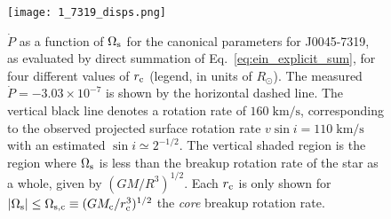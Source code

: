 \documentclass[
        fleqn,
        usenatbib,
    ]{mnras}
\newcommand*{\abs}[1]{\left|#1\right|}
\begin{document}
\begin{figure}
    \centering
    \texttt{[image: 1\_7319\_disps.png]}
    \caption{$\dot{P}$ as a function of $\Omega_{\rm s}$ for the canonical
    parameters for J0045-7319, as evaluated by direct summation of
    Eq.~\eqref{eq:ein_explicit_sum}, for four different values of $r_{\rm c}$
    (legend, in units of $R_{\odot}$). The measured $\dot{P} = -3.03\times
    10^{-7}$ is shown by the horizontal dashed line. The vertical black line
    denotes a rotation rate of $160\;\mathrm{km/s}$, corresponding to the
    observed projected surface rotation rate $v \sin i = 110\;\mathrm{km/s}$
    with an estimated $\sin i \simeq 2^{-1/2}$. The vertical shaded region is
    the region where $\Omega_{\rm s}$ is less than the breakup rotation rate of
    the star as a whole, given by $(GM / R^3)^{1/2}$. Each $r_{\rm c}$ is only
    shown for $\abs{\Omega_{\rm s}} \leq \Omega_{\rm s, c} \equiv (GM_{\rm c} /
    r_{\rm c}^3)^{1/2}$ the \emph{core} breakup rotation rate.
    }\label{fig:j0045_fid}
\end{figure}


\end{document}

